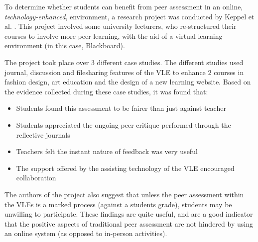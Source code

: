 \documentclass[a4paper,11pt]{report}
\begin{document}
To determine whether students can benefit from peer assessment in an online, \textit{technology-enhanced}, environment, a research project was conducted by Keppel et al. \cite{keppell_peer_2006}. This project involved some university lecturers, who re-structured their courses to involve more peer learning, with the aid of a virtual learning environment (in this case, Blackboard).\par
The project took place over 3 different case studies. The different studies used journal, discussion and filesharing features of the VLE to enhance 2 courses in fashion design, art education and the design of a new learning website. Based on the evidence collected during these case studies, it was found that:
\begin{itemize}
 \item Students found this assessment to be fairer than just against teacher
 \item Students appreciated the ongoing peer critique performed through the reflective journals
 \item Teachers felt the instant nature of feedback was very useful
 \item The support offered by the assisting technology of the VLE encouraged collaboration
\end{itemize}
The authors of the project also suggest that unless the peer assessment within the VLEs is a marked process (against a students grade), students may be unwilling to participate. These findings are quite useful, and are a good indicator that the positive aspects of traditional peer assessment are not hindered by using an online system (as opposed to in-person activities).\par
\end{document}
